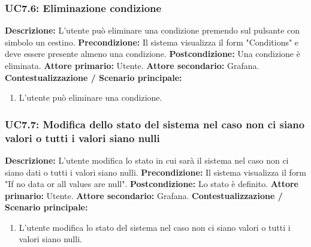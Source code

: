                 
                
                \subsubsection{UC7.6: Eliminazione condizione }
                    \textbf{Descrizione:} L’utente può eliminare una condizione premendo sul pulsante con simbolo un cestino.
                    \newline
                    \textbf{Precondizione:} Il sistema visualizza il form "Conditions" e deve essere presente almeno una condizione.
                    \newline
                    \textbf{Postcondizione:} Una condizione è eliminata.
                    \newline
                    \textbf{Attore primario:} Utente.
                    \newline
                    \textbf{Attore secondario:} Grafana.
                    \newline
                    \textbf{Contestualizzazione / Scenario principale:} \begin{enumerate}
                            \item L'utente può eliminare una condizione.
                        \end{enumerate}
                        
                \subsubsection{UC7.7: Modifica dello stato del sistema nel caso non ci siano valori o tutti i valori siano nulli }
                    \textbf{Descrizione:} L’utente modifica lo stato in cui sarà il sistema nel caso non ci siano dati o tutti i valori siano nulli.
                    \newline
                    \textbf{Precondizione:} Il sistema visualizza il form "If no data or all values are null".
                    \newline
                    \textbf{Postcondizione:} Lo stato è definito.
                    \newline
                    \textbf{Attore primario:} Utente.
                    \newline
                    \textbf{Attore secondario:} Grafana.
                    \newline
                    \textbf{Contestualizzazione / Scenario principale:} \begin{enumerate}
                            \item L'utente modifica lo stato del sistema nel caso non ci siano valori o tutti i valori siano nulli.
                        \end{enumerate}
                        

